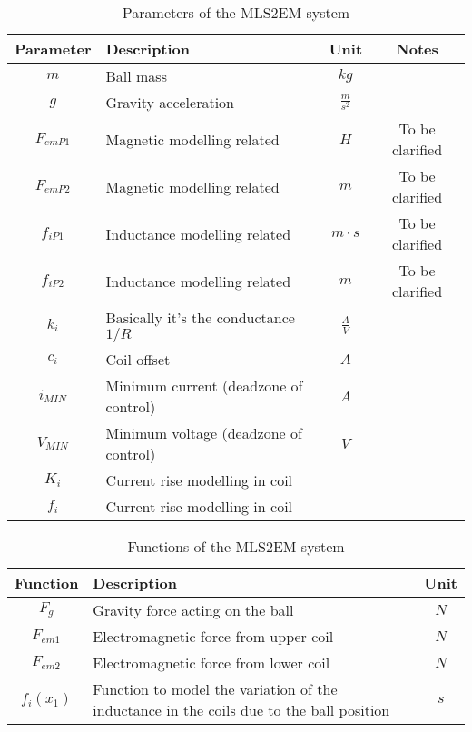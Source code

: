 \begin{table}[H]
    \centering
    \begin{tabular}{|c|l|c|c|}
        \hline
        Parameter  & Description                           & Unit            & Notes           \\
        \hline
        $m$        & Ball mass                             & $kg$            &                 \\
        $g$        & Gravity acceleration                  & $\frac{m}{s^2}$ &                 \\
        $F_{emP1}$ & Magnetic modelling related            & $H$             & To be clarified \\
        $F_{emP2}$ & Magnetic modelling related            & $m$             & To be clarified \\
        $f_{iP1}$  & Inductance modelling related          & $m \cdot s$     & To be clarified \\
        $f_{iP2}$  & Inductance modelling related          & $m$             & To be clarified \\
        $k_i$      & Basically it's the conductance $1/R$  & $\frac{A}{V}$   &                 \\
        $c_i$      & Coil offset                           & $A$             &                 \\
        $i_{MIN}$  & Minimum current (deadzone of control) & $A$             &                 \\
        $V_{MIN}$  & Minimum voltage (deadzone of control) & $V$             &                 \\
        $K_i$      & Current rise modelling in coil        &                 &                 \\
        $f_i$      & Current rise modelling in coil        &                 &                 \\
        \hline
    \end{tabular}
    \caption{Parameters of the MLS2EM system}
    \label{tab:parameters}
\end{table}

\begin{table}[H]
    \centering
    \begin{tabular}{|c|l|c|}
        \hline
        Function   & Description                                                                             & Unit \\
        \hline
        $F_g$      & Gravity force acting on the ball                                                        & $N$  \\
        $F_{em1}$  & Electromagnetic force from upper coil                                                   & $N$  \\
        $F_{em2}$  & Electromagnetic force from lower coil                                                   & $N$  \\
        $f_i(x_1)$ & Function to model the variation of the inductance in the coils due to the ball position & $s$  \\
        \hline
    \end{tabular}
    \caption{Functions of the MLS2EM system}
    \label{tab:functions}
\end{table}